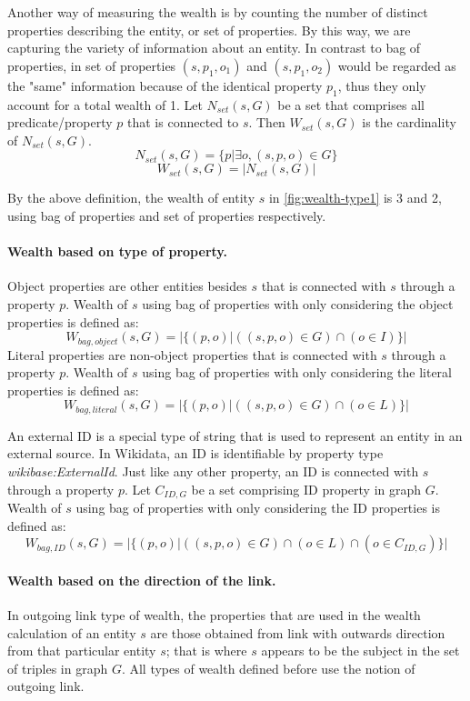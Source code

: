 Another way of measuring the wealth is by counting the number of distinct properties describing the entity, or set of properties. By this way, we are capturing the variety of information about an entity. In contrast to bag of properties, in set of properties \((s, p_1, o_1)\) and \((s, p_1, o_2)\) would be regarded as the "same" information because of the identical property \(p_1\), thus they only account for a total wealth of 1. Let \(N_{set}(s,G)\) be a set that comprises all predicate/property \(p\) that is connected to \(s\). Then \(W_{set}(s, G)\) is the cardinality of \(N_{set}(s,G)\).
\[
    N_{set}(s, G) = \{p | \exists o, (s, p, o) \in G\}
\]
\[
    W_{set}(s, G) = |N_{set}(s,G)|
\]

By the above definition, the wealth of entity \(s\) in \autoref{fig:wealth-type1} is 3 and 2, using bag of properties and set of properties respectively.

\paragraph{Wealth based on type of property.}
Object properties are other entities besides \(s\) that is connected with \(s\) through a property \(p\). Wealth of \(s\) using bag of properties with only considering the object properties is defined as:
\[
    W_{bag, object}(s, G) = |\{(p,o) | ((s, p, o) \in G) \cap (o \in I)\}|
\]
Literal properties are non-object properties that is connected with \(s\) through a property \(p\). Wealth of \(s\) using bag of properties with only considering the literal properties is defined as:
\[
    W_{bag, literal}(s, G) = |\{(p,o) | ((s, p, o) \in G) \cap (o \in L)\}|
\]

An external ID is a special type of string that is used to represent an entity in an external source. In Wikidata, an ID is identifiable by property type \textit{wikibase:ExternalId}. Just like any other property, an ID is connected with \(s\) through a property \(p\). Let  \(C_{ID,G}\) be a set comprising ID property in graph \(G\). Wealth of \(s\) using bag of properties with only considering the ID properties is defined as:
\[
    W_{bag, ID}(s, G) = |\{(p,o) | ((s, p, o) \in G) \cap (o \in L) \cap (o \in C_{ID,G})\}|
\]

\paragraph{Wealth based on the direction of the link.}
In outgoing link type of wealth, the properties that are used in the wealth calculation of an entity \(s\) are those obtained from link with outwards direction from that particular entity \(s\); that is where \(s\) appears to be the subject in the set of triples in graph \(G\). All types of wealth defined before use the notion of outgoing link.

